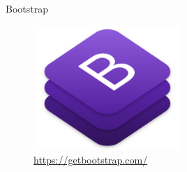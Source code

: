 \begin{frame}{Bootstrap}
    \begin{center}
        \begin{figure}[h]
            \includegraphics[width=0.5\textwidth]{imagens/bootstrap-logo.png}
            \caption{\url{https://getbootstrap.com/}}
        \end{figure}
	\end{center}
\end{frame}
